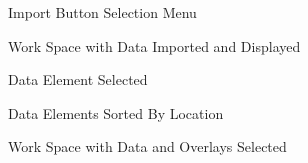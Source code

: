 \documentclass[onecolumn, draftclsnofoot,10pt, compsoc]{IEEEtran}
\begin{document}
\begin{singlespace}
        \begin{figure}[H]
        \caption{Import Button Selection Menu}
        \label{fig:Mockup2}
        \end{figure}
        
        \begin{figure}[H]
        \caption{Work Space with Data Imported and Displayed}
        \label{fig:Mockup3}
        \end{figure}
        
        \begin{figure}[H]
        \caption{Data Element Selected}
        \label{fig:Mockup4}
        \end{figure}
        
        \begin{figure}[H]
        \caption{Data Elements Sorted By Location}
        \label{fig:Mockup5}
        \end{figure}
        
        \begin{figure}[H]
        \caption[Work Space with Data and Overlays Selected]{Work Space with Data and Overlays Selected\cite{windyMap}}
        \label{fig:Mockup6}
        \end{figure}

\renewcommand\refname{Bibliography}

\pagebreak
\nocite{*}%



\end{singlespace}
\end{document}

